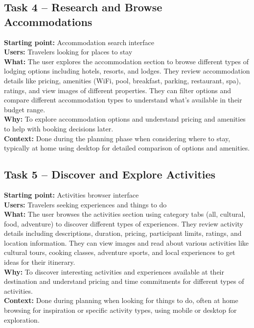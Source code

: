 \documentclass[11pt,a4paper]{article}
\begin{document}
\subsection*{Task 4 – Research and Browse Accommodations}
\textbf{Starting point:} Accommodation search interface \\
\textbf{Users:} Travelers looking for places to stay \\
\textbf{What:} The user explores the accommodation section to browse different types of lodging options including hotels, resorts, and lodges. They review accommodation details like pricing, amenities (WiFi, pool, breakfast, parking, restaurant, spa), ratings, and view images of different properties. They can filter options and compare different accommodation types to understand what's available in their budget range. \\
\textbf{Why:} To explore accommodation options and understand pricing and amenities to help with booking decisions later. \\
\textbf{Context:} Done during the planning phase when considering where to stay, typically at home using desktop for detailed comparison of options and amenities.

\subsection*{Task 5 – Discover and Explore Activities}
\textbf{Starting point:} Activities browser interface \\
\textbf{Users:} Travelers seeking experiences and things to do \\
\textbf{What:} The user browses the activities section using category tabs (all, cultural, food, adventure) to discover different types of experiences. They review activity details including descriptions, duration, pricing, participant limits, ratings, and location information. They can view images and read about various activities like cultural tours, cooking classes, adventure sports, and local experiences to get ideas for their itinerary. \\
\textbf{Why:} To discover interesting activities and experiences available at their destination and understand pricing and time commitments for different types of activities. \\
\textbf{Context:} Done during planning when looking for things to do, often at home browsing for inspiration or specific activity types, using mobile or desktop for exploration.
\end{document}
